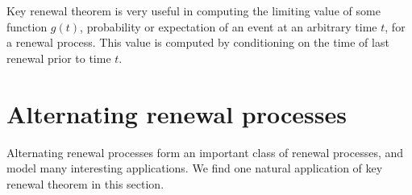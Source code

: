 \documentclass[a4paper,10pt,english]{article}
\begin{document}
Key renewal theorem is very useful in computing the limiting value of some function $g(t)$, probability or expectation of an event at an arbitrary time $t$, for a renewal process. This value is computed by conditioning on the time of last renewal prior to time $t$.

%

\section{Alternating renewal processes}
Alternating renewal processes form an important class of renewal processes, and model many interesting applications. 
We find one natural application of  key renewal theorem  in this section. 
\end{document}
